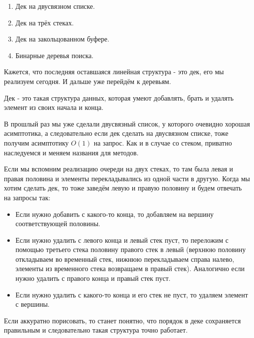 \label{md2tex7}
\hyperref[md2texREADME]{\color{cyan}{К главному описанию}}


\begin{enumerate}
    \item Дек на двусвязном списке.
    \item Дек на трёх стеках.
    \item Дек на закольцованном буфере.
    \item Бинарные деревья поиска.
\end{enumerate}


Кажется, что последняя оставшаяся линейная структура - это дек, его мы реализуем сегодня. И дальше уже перейдём к деревьям.


Дек - это такая структура данных, которая умеют добавлять, брать и удалять элемент из своих начала и конца.

В прошлый раз мы уже сделали двусвязный список, у которого очевидно хорошая асимптотика, а следовательно если дек сделать на двусвязном списке, тоже получим асимптотику $O(1)$ на запрос. Как и в случае со стеком, приватно наследуемся и меняем названия для методов.


Если мы вспомним реализацию очереди на двух стеках, то там была левая и правая половина и элементы перекладывались из одной части в другую. Когда мы хотим сделать дек, то тоже заведём левую и правую половину и будем отвечать на запросы так:
\begin{itemize}
    \item Если нужно добавить с какого-то конца, то добавляем на вершину соответствующей половины.
    \item Если нужно удалить с левого конца и левый стек пуст, то переложим с помощью третьего стека половину правого стек в левый (верхнюю половину откладываем во временный стек, нижнюю перекладываем справа налево, элементы из временного стека возвращаем в правый стек). Аналогично если нужно удалить с правого конца и правый стек пуст.
    \item Если нужно удалить с какого-то конца и его стек не пуст, то удаляем элемент с вершины.
\end{itemize}

Если аккуратно порисовать, то станет понятно, что порядок в деке сохраняется правильным и следовательно такая структура точно работает.

